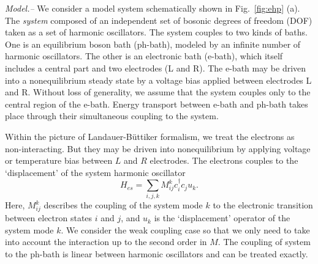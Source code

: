 \documentclass[aps
,twocolumn
,floatfix,footinbib,prl
]{revtex4-1}
\begin{document}
\emph{Model.--} 
We consider a model system schematically shown in Fig.~\ref{fig:ehp} (a). The \emph{system} composed of an independent set of bosonic degrees of freedom (DOF) taken as a set of harmonic oscillators. The system couples to two kinds of baths. One is an equilibrium boson bath (ph-bath), modeled by an infinite number of harmonic oscillators. The other is an electronic bath (e-bath), which itself includes a central part and two electrodes (L and R).  The e-bath may be driven into a nonequilibrium steady state by a voltage bias applied between electrodes L and R. Without loss of generality, we assume that the system couples only to the central region of the e-bath. Energy transport between e-bath and ph-bath takes place through their simultaneous coupling to the system. 

Within the picture of Landauer-B\"uttiker formalism, we treat the electrons as non-interacting. But they may be driven into nonequilibrium by applying voltage or temperature bias between $L$ and $R$ electrodes. The electrons couples to the `displacement' of the system harmonic oscillator
\begin{equation}
H_{es} = \sum_{i,j,k} M^{k}_{ij}c^\dagger_i c_j u_k.
\end{equation}
Here, $M^k_{ij}$ describes the coupling of the system mode $k$ to the electronic transition between electron states $i$ and $j$, and $u_k$ is the `displacement' operator of the system mode $k$. We consider the weak coupling case so that we only need to take into account the interaction up to the second order in $M$. The coupling of system to the ph-bath is linear between harmonic oscillators and can be treated exactly.



\end{document}
